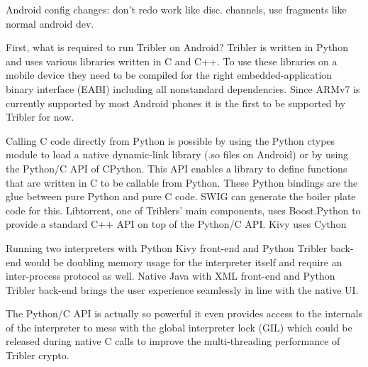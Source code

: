 Android config changes: don't redo work like disc. channels, use fragments like normal android dev.




First, what is required to run Tribler on Android?
Tribler is written in Python and uses various libraries written in C and C++.
To use these libraries on a mobile device they need to be compiled for the right embedded-application binary interface (EABI) including all nonstandard dependencies.
Since ARMv7 is currently supported by most Android phones it is the first to be supported by Tribler for now.


Calling C code directly from Python is possible by using the Python ctypes module to load a native dynamic-link library (.so files on Android) or by using the Python/C API of CPython.
This API enables a library to define functions that are written in C to be callable from Python.
These Python bindings are the glue between pure Python and pure C code.
SWIG can generate the boiler plate code for this.
Libtorrent, one of Triblers' main components, uses Boost.Python to provide a standard C++ API on top of the Python/C API.
Kivy uses Cython


Running two interpreters with Python Kivy front-end and Python Tribler back-end would be doubling memory usage for the interpreter itself and require an inter-process protocol as well.
Native Java with XML front-end and Python Tribler back-end brings the user experience seamlessly in line with the native UI.



The Python/C API is actually so powerful it even provides access to the internals of the interpreter to mess with the global interpreter lock (GIL) which could be released during native C calls to improve the multi-threading performance of Tribler crypto.

